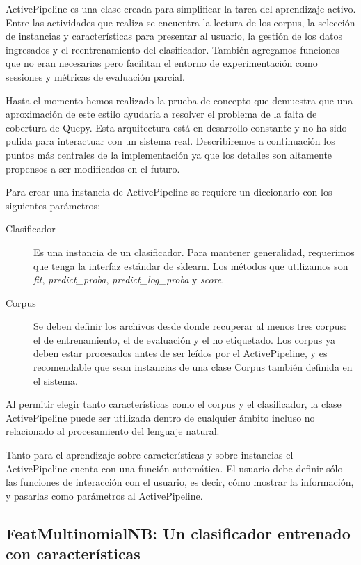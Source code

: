 ActivePipeline es una clase creada para simplificar la tarea del aprendizaje activo. Entre las actividades que realiza se encuentra la lectura de los corpus, la selección de instancias y características para presentar al usuario, la gestión de los datos ingresados y el reentrenamiento del clasificador. También agregamos funciones que no eran necesarias pero facilitan el entorno de experimentación como sessiones y métricas de evaluación parcial.

Hasta el momento hemos realizado la prueba de concepto que demuestra que una aproximación de este estilo ayudaría a resolver el problema de la falta de cobertura de Quepy. Esta arquitectura está en desarrollo constante y no ha sido pulida para interactuar con un sistema real. Describiremos a continuación los puntos más centrales de la implementación ya que los detalles son altamente propensos a ser modificados en el futuro.

Para crear una instancia de ActivePipeline se requiere un diccionario con los siguientes parámetros:
\begin{description}
    \item[Clasificador] Es una instancia de un clasificador. Para mantener generalidad, requerimos que tenga la interfaz estándar de sklearn. Los métodos que utilizamos son \textit{fit}, \textit{predict\_proba}, \textit{predict\_log\_proba} y \textit{score}.
    \item[Corpus] Se deben definir los archivos desde donde recuperar al menos tres corpus: el de entrenamiento, el de evaluación y el no etiquetado. Los corpus ya deben estar procesados antes de ser leídos por el ActivePipeline, y es recomendable que sean instancias de una clase Corpus también definida en el sistema.
\end{description}
Al permitir elegir tanto características como el corpus y el clasificador, la clase ActivePipeline puede ser utilizada dentro de cualquier ámbito incluso no relacionado al procesamiento del lenguaje natural.

Tanto para el aprendizaje sobre características y sobre instancias el ActivePipeline cuenta con una función automática. El usuario debe definir sólo las funciones de interacción con el usuario, es decir, cómo mostrar la información, y pasarlas como parámetros al ActivePipeline.

\subsection{FeatMultinomialNB: Un clasificador entrenado con características}

